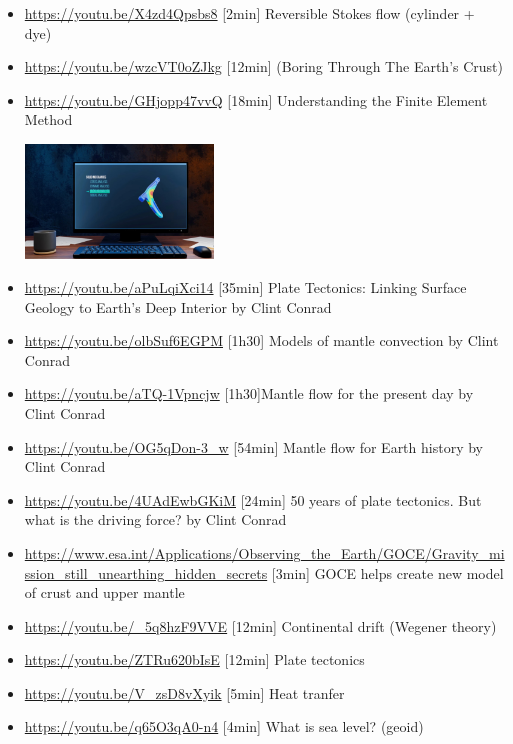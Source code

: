 \begin{itemize}
\item \url{https://youtu.be/X4zd4Qpsbs8} [2min] Reversible Stokes flow (cylinder + dye)
\item \url{https://youtu.be/wzcVT0oZJkg} [12min] (Boring Through The Earth's Crust)
\item \url{https://youtu.be/GHjopp47vvQ} [18min] Understanding the Finite Element Method
\begin{center}
\includegraphics[width=5cm]{images/youtube/fem}\\
\end{center}
\item \url{https://youtu.be/aPuLqiXci14} [35min] Plate Tectonics: Linking Surface Geology to Earth’s Deep Interior by Clint Conrad 
\item \url{https://youtu.be/olbSuf6EGPM} [1h30] Models of mantle convection by Clint Conrad 
\item \url{https://youtu.be/aTQ-1Vpncjw} [1h30]Mantle flow for the present day by Clint Conrad 
\item \url{https://youtu.be/OG5qDon-3_w} [54min] Mantle flow for Earth history by Clint Conrad 
\item \url{https://youtu.be/4UAdEwbGKiM} [24min] 50 years of plate tectonics. But what is the driving force? by Clint Conrad
\item \url{https://www.esa.int/Applications/Observing_the_Earth/GOCE/Gravity_mission_still_unearthing_hidden_secrets} [3min] GOCE helps create new model of crust and upper mantle

\item \url{https://youtu.be/_5q8hzF9VVE} [12min] Continental drift (Wegener theory) 
\item \url{https://youtu.be/ZTRu620bIsE} [12min] Plate tectonics
\item \url{https://youtu.be/V_zsD8vXyik} [5min] Heat tranfer 
\item \url{https://youtu.be/q65O3qA0-n4} [4min] What is sea level? (geoid) 

\end{itemize}



